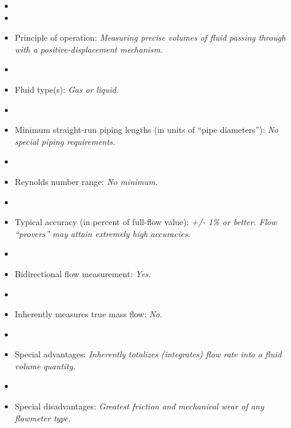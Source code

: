 \documentclass[12pt,a4paper]{article}
\begin{document}
\begin{itemize}
\goodbreak
\item{} 
\vskip 5pt
\item\item{} Principle of operation: {\it Measuring precise volumes of fluid passing through with a positive-displacement mechanism.}
\vskip 5pt
\item\item{} Fluid type(s): {\it Gas or liquid.}
\vskip 5pt
\item\item{} Minimum straight-run piping lengths (in units of ``pipe diameters''): {\it No special piping requirements.}
\vskip 5pt
\item\item{} Reynolds number range: {\it No minimum.}
\vskip 5pt
\item\item{} Typical accuracy (in percent of full-flow value): {\it +/- 1\% or better.  Flow ``provers'' may attain extremely high accuracies.}
\vskip 5pt
\item\item{} Bidirectional flow measurement: {\it Yes.}
\vskip 5pt
\item\item{} Inherently measures true mass flow: {\it No.}
\vskip 5pt
\item\item{} Special advantages: {\it Inherently totalizes (integrates) flow rate into a fluid volume quantity.}
\vskip 5pt
\item\item{} Special disadvantages: {\it Greatest friction and mechanical wear of any flowmeter type.}
\end{itemize}
\end{document}
